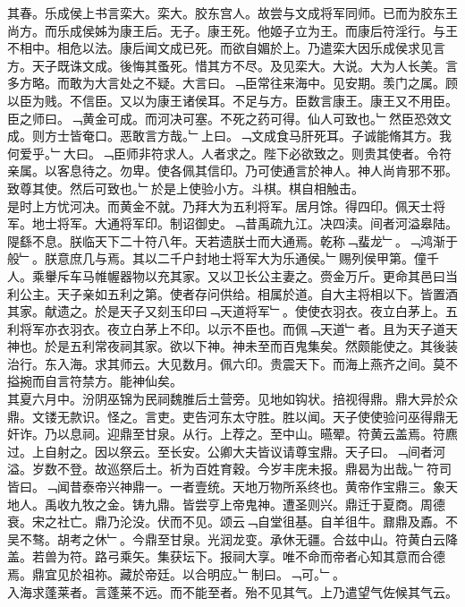 \documentclass{zhvt-classic}
\begin{document}
\hspace*{2em}其春。乐成侯上书言栾大。栾大。胶东宫人。故尝与文成将军同师。已而为胶东王尚方。而乐成侯姊为康王后。无子。康王死。他姬子立为王。而康后符淫行。与王不相中。相危以法。康后闻文成已死。而欲自媚於上。乃遣栾大因乐成侯求见言方。天子既诛文成。後悔其蚤死。惜其方不尽。及见栾大。大说。大为人长美。言多方略。而敢为大言处之不疑。大言曰。﹁臣常往来海中。见安期。羡门之属。顾以臣为贱。不信臣。又以为康王诸侯耳。不足与方。臣数言康王。康王又不用臣。臣之师曰。﹁黄金可成。而河决可塞。不死之药可得。仙人可致也。﹂然臣恐效文成。则方士皆奄口。恶敢言方哉。﹂上曰。﹁文成食马肝死耳。子诚能脩其方。我何爱乎。﹂大曰。﹁臣师非符求人。人者求之。陛下必欲致之。则贵其使者。令符亲属。以客息待之。勿卑。使各佩其信印。乃可使通言於神人。神人尚肯邪不邪。致尊其使。然后可致也。﹂於是上使验小方。斗棋。棋自相触击。\\
\hspace*{2em}是时上方忧河决。而黄金不就。乃拜大为五利将军。居月馀。得四印。佩天士将军。地士将军。大通将军印。制诏御史。﹁昔禹疏九江。决四渎。间者河溢皋陆。隄繇不息。朕临天下二十符八年。天若遗朕士而大通焉。乾称﹁蜚龙﹂。﹁鸿渐于般﹂。朕意庶几与焉。其以二千户封地士将军大为乐通侯。﹂赐列侯甲第。僮千人。乘轝斥车马帷幄器物以充其家。又以卫长公主妻之。赍金万斤。更命其邑曰当利公主。天子亲如五利之第。使者存问供给。相属於道。自大主将相以下。皆置酒其家。献遗之。於是天子又刻玉印曰﹁天道将军﹂。使使衣羽衣。夜立白茅上。五利将军亦衣羽衣。夜立白茅上不印。以示不臣也。而佩﹁天道﹂者。且为天子道天神也。於是五利常夜祠其家。欲以下神。神未至而百鬼集矣。然颇能使之。其後装治行。东入海。求其师云。大见数月。佩六印。贵震天下。而海上燕齐之间。莫不搤捥而自言符禁方。能神仙矣。\\
\hspace*{2em}其夏六月中。汾阴巫锦为民祠魏脽后土营旁。见地如钩状。掊视得鼎。鼎大异於众鼎。文镂无款识。怪之。言吏。吏告河东太守胜。胜以闻。天子使使验问巫得鼎无奸诈。乃以息祠。迎鼎至甘泉。从行。上荐之。至中山。曣翚。符黄云盖焉。符麃过。上自射之。因以祭云。至长安。公卿大夫皆议请尊宝鼎。天子曰。﹁间者河溢。岁数不登。故巡祭后土。祈为百姓育穀。今岁丰庑未报。鼎曷为出哉。﹂符司皆曰。﹁闻昔泰帝兴神鼎一。一者壹统。天地万物所系终也。黄帝作宝鼎三。象天地人。禹收九牧之金。铸九鼎。皆尝亨上帝鬼神。遭圣则兴。鼎迁于夏商。周德衰。宋之社亡。鼎乃沦没。伏而不见。颂云﹁自堂徂基。自羊徂牛。鼐鼎及鼒。不吴不骜。胡考之休﹂。今鼎至甘泉。光润龙变。承休无疆。合兹中山。符黄白云降盖。若兽为符。路弓乘矢。集获坛下。报祠大享。唯不命而帝者心知其意而合德焉。鼎宜见於祖祢。藏於帝廷。以合明应。﹂制曰。﹁可。﹂。\\
\hspace*{2em}入海求蓬莱者。言蓬莱不远。而不能至者。殆不见其气。上乃遣望气佐候其气云。\\
\end{document}
